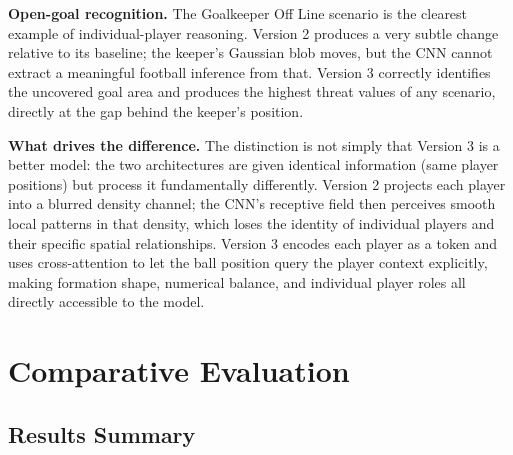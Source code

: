 \documentclass{article}
\begin{document}
\textbf{Open-goal recognition.} The Goalkeeper Off Line scenario is the clearest example of individual-player reasoning. Version 2 produces a very subtle change relative to its baseline; the keeper's Gaussian blob moves, but the CNN cannot extract a meaningful football inference from that. Version 3 correctly identifies the uncovered goal area and produces the highest threat values of any scenario, directly at the gap behind the keeper's position.

\textbf{What drives the difference.} The distinction is not simply that Version 3 is a better model: the two architectures are given identical information (same player positions) but process it fundamentally differently. Version 2 projects each player into a blurred density channel; the CNN's receptive field then perceives smooth local patterns in that density, which loses the identity of individual players and their specific spatial relationships. Version 3 encodes each player as a token and uses cross-attention to let the ball position query the player context explicitly, making formation shape, numerical balance, and individual player roles all directly accessible to the model.

\section{Comparative Evaluation}\label{sec:comparison}

\subsection{Results Summary}

%
%
\end{document}
